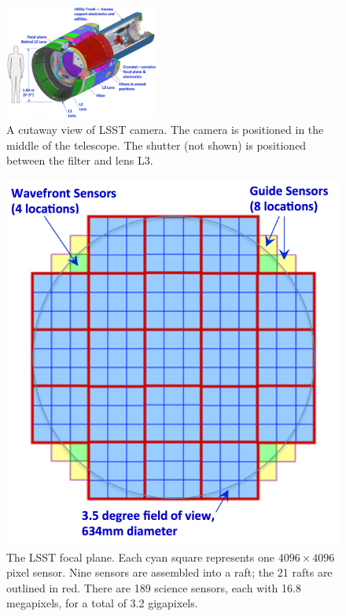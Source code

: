 \begin{figure}[t!]
\hskip 0.1in
\includegraphics[width=0.45\textwidth]{CameraFigureUpdated.pdf}
\caption{A cutaway view of LSST camera. The camera is positioned in the middle of the telescope.  The shutter (not shown) is positioned between the filter and lens L3.}
\label{Fig:camera}
\end{figure}


\begin{figure}[ht]
\includegraphics[width=1.0\hsize,clip]{fov-updated-cropped.pdf}
\caption{The LSST focal plane. Each cyan square represents one
$4096\times4096$ pixel sensor. Nine sensors are assembled into a
raft; the 21 rafts are outlined in red. There are 189 science sensors, each
with 16.8 megapixels, for a total of 3.2 gigapixels.}
\label{Fig:fov}
\end{figure}

